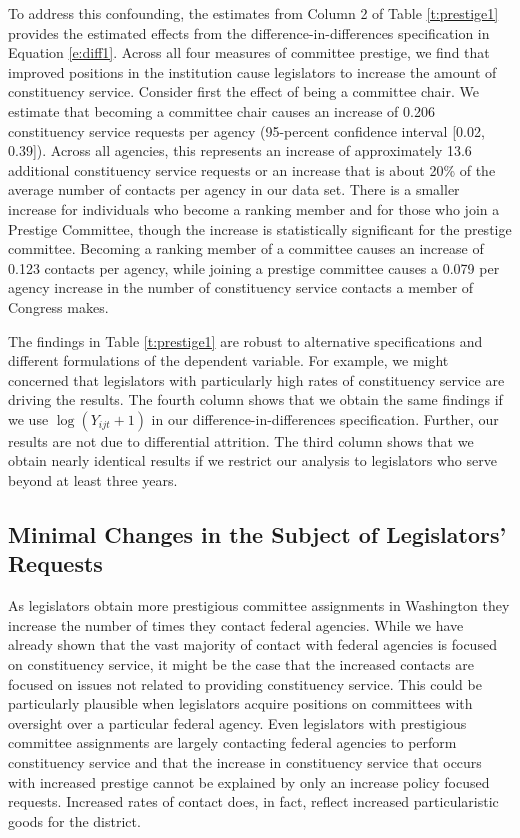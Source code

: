 \documentclass[12pt]{article}
\begin{document}
To address this confounding, the estimates from Column 2 of Table \ref{t:prestige1} provides the estimated effects from the difference-in-differences specification in Equation \ref{e:diff1}.  Across all four measures of committee prestige, we find that improved positions in the institution cause legislators to increase the amount of constituency service.  Consider first the effect of being a committee chair.  We estimate that becoming a committee chair causes an increase of 0.206 constituency service requests per agency (95-percent confidence interval [0.02, 0.39]).  Across all agencies, this represents an increase of approximately 13.6 additional constituency service requests or an increase that is about 20\% of the average number of contacts per agency in our data set. There is a smaller increase for individuals who become a ranking member and for those who join a Prestige Committee, though the increase is statistically significant for the prestige committee.  Becoming a ranking member of a committee causes an increase of 0.123 contacts per agency, while joining a prestige committee causes a 0.079 per agency increase in the number of constituency service contacts a member of Congress makes.

The findings in Table \ref{t:prestige1} are robust to alternative specifications and different formulations of the dependent variable.  For example, we might concerned that legislators with particularly high rates of constituency service are driving the results.  The fourth column shows that we obtain the same findings if we use $\log (Y_{ijt} + 1)$ in our difference-in-differences specification. Further, our results are not due to differential attrition.  The third column shows that we obtain nearly identical results if we restrict our analysis to legislators who serve beyond at least three years.      


\subsection{Minimal Changes in the Subject of Legislators' Requests}
As legislators obtain more prestigious committee assignments in Washington they increase the number of times they contact federal agencies.  While we have already shown that the vast majority of contact with federal agencies is focused on constituency service, it might be the case that the increased contacts are focused on issues not related to providing constituency service.  This could be particularly plausible when legislators acquire positions on committees with oversight over a particular federal agency.  Even legislators with prestigious committee assignments are largely contacting federal agencies to perform constituency service and that the increase in constituency service that occurs with increased prestige cannot be explained by only an increase policy focused requests.  Increased rates of contact does, in fact, reflect increased particularistic goods for the district.   
\end{document}
